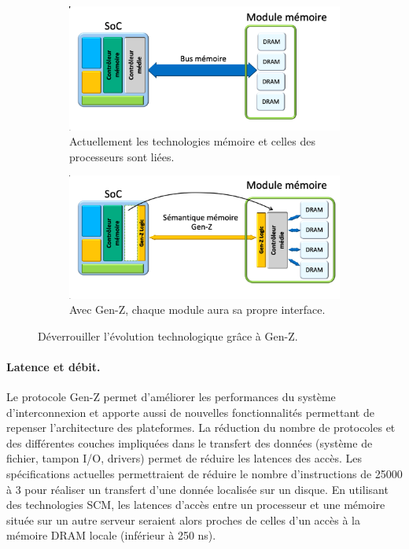             \begin{figure}[t!]
                \centering
                \begin{subfigure}[t]{0.49\textwidth}
                    \centering
                    \includegraphics[width=\linewidth]{images/edl_genz_current_bus.png}
                    \caption{\label{fig:edl_genz_current_bus} Actuellement les technologies mémoire et celles des processeurs sont liées.}
                \end{subfigure}\hfill
                \begin{subfigure}[t]{0.49\textwidth}
                    \centering
                    \includegraphics[width=\linewidth]{images/edl_genz_new_bus.png}
                    \caption{\label{fig:edl_genz_new_bus} Avec Gen-Z, chaque module aura sa propre interface.}
                \end{subfigure}
                \caption{\label{fig:edl_genz_bus_evo} Déverrouiller l'évolution technologique grâce à Gen-Z.}
            \end{figure}


    \paragraph{Latence et débit.}

        Le protocole Gen-Z permet d'améliorer les performances du système d'interconnexion et apporte aussi de nouvelles fonctionnalités permettant de repenser l'architecture des plateformes. La réduction du nombre de protocoles et des différentes couches impliquées dans le transfert des données (système de fichier, tampon I/O, drivers) permet de réduire les latences des accès. Les spécifications actuelles permettraient de réduire le nombre d'instructions de 25000 à 3 pour réaliser un transfert d'une donnée localisée sur un disque. En utilisant des technologies SCM, les latences d'accès entre un processeur et une mémoire située sur un autre serveur seraient alors proches de celles d'un accès à la mémoire DRAM locale (inférieur à 250 ns).
     
